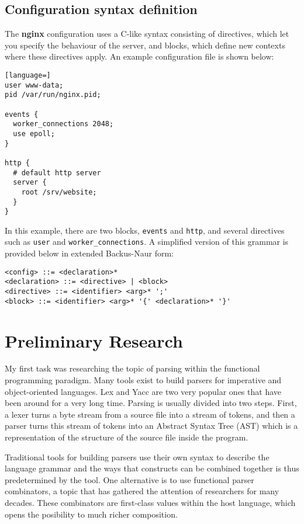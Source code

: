 \documentclass[]{article}
\begin{document}
\subsection{Configuration syntax definition}\label{syntax-definition}

The \textbf{nginx} configuration uses a C-like syntax consisting of
directives, which let you specify the behaviour of the server, and
blocks, which define new contexts where these directives apply. An
example configuration file is shown below:

\begin{lstlisting}[language=]
user www-data;
pid /var/run/nginx.pid;

events {
  worker_connections 2048;
  use epoll;
}

http {
  # default http server
  server {
    root /srv/website;
  }
}
\end{lstlisting}

In this example, there are two blocks, \texttt{events} and
\texttt{http}, and several directives such as \texttt{user} and
\texttt{worker\_connections}. A simplified version of this grammar
is provided below in extended Backus-Naur form:

\begin{lstlisting}[numbers=none]
<config> ::= <declaration>*
<declaration> ::= <directive> | <block>
<directive> ::= <identifier> <arg>* ';'
<block> ::= <identifier> <arg>* '{' <declaration>* '}'
\end{lstlisting}

\section{Preliminary Research}\label{preliminary-research}

My first task was researching the topic of parsing within the
functional programming paradigm.
Many tools exist to build parsers for imperative and object-oriented
languages. Lex and Yacc are two very popular
ones that have been around for a very long time. Parsing is usually
divided into two steps. First, a lexer turns a byte stream from a source file into a
stream of tokens, and then a parser turns this stream of tokens
into an Abstract Syntax Tree (AST) which is a representation of the
structure of the source file inside the program.

Traditional tools for building parsers use their own syntax to describe
the language grammar and the ways that constructs can be combined together
is thus predetermined by the tool. One alternative is to use functional parser
combinators, a topic that has gathered the attention of researchers for
many decades. These combinators are first-class values within the host language,
which opens the posibility to much richer composition.
\end{document}
